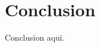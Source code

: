 \documentclass[journal]{IEEEtran}
\begin{document}
%





\section{Conclusion}
Conclusion aqui.






%
\end{document}
